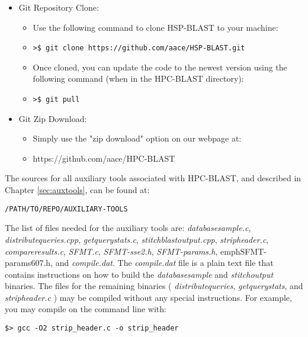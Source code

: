 \documentclass[10pt]{article}
\begin{document}
\begin{itemize}
  \item Git Repository Clone:
  \begin{itemize}
    \item Use the following command to clone HSP-BLAST to your machine:
      \item \verb|>$ git clone https://github.com/aace/HSP-BLAST.git|
      \item Once cloned, you can update the code to the newest version using the following command (when in the HPC-BLAST directory):
      \item \verb|>$ git pull|
    \end{itemize}
  \item Git Zip Download:
  \begin{itemize}
    \item  Simply use the "zip download" option on our webpage at:
    \item https://github.com/aace/HPC-BLAST
  \end{itemize}
\end{itemize}



\noindent The sources for all auxiliary tools associated with HPC-BLAST, and described in Chapter \ref{sec:auxtools}, can be found at:
\begin{verbatim}
/PATH/TO/REPO/AUXILIARY-TOOLS
\end{verbatim}

\noindent The list of files needed for the auxiliary tools are: \emph{database\textunderscore sample.c}, \emph{distribute\textunderscore queries.cpp}, \emph{get\textunderscore query\textunderscore stats.c}, \emph{stitch\textunderscore blast\textunderscore output.cpp}, \emph{strip\textunderscore header.c},
\emph{compare\textunderscore results.c}, \emph{SFMT.c}, \emph{SFMT-sse2.h}, \emph{SFMT-params.h}, emph{SFMT-params607.h}, and \emph{compile.dat}.  The \emph{compile.dat} file is a plain text file that contains instructions on how to build the \emph{database\textunderscore sample}
and \emph{stitch\textunderscore output} binaries.  The files for the remaining binaries ( \emph{distribute\textunderscore queries},  \emph{get\textunderscore query\textunderscore stats}, and \emph{strip\textunderscore header.c} ) may be compiled without any special instructions.  For example,
you may compile on the command line with:
\begin{verbatim}
$> gcc -O2 strip_header.c -o strip_header
\end{verbatim}
\end{document}
